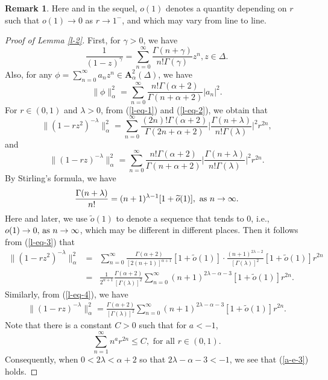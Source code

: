 \documentclass[10pt]{amsart}
\theoremstyle{definition}    %
\newtheorem{remark}[theorem]{Remark}
\numberwithin{equation}{section}
\begin{document}
\begin{remark}Here and in the sequel, ${o}(1)$ denotes a quantity depending on $r$ such that ${o}(1)\rightarrow 0$ as $r\rightarrow 1^{-}$, and which may vary from line to line.\end{remark}

\begin{proof}[Proof of Lemma \ref{l-2}]
First, for $\gamma>0$, we have 
\begin{equation}\label{l-eq-1}
  \frac{1}{(1-z)^{\gamma}}=\sum_{n=0}^{\infty}\frac{\Gamma(n+\gamma)}{n!\Gamma(\gamma)}z^n, z\in \Delta.\end{equation}
Also, for any $\phi=\sum_{n=0}^{\infty}a_nz^n\in \mathbf{A}_{\alpha}^2(\Delta)$, we have
\begin{equation}\label{l-eq-2}\|\phi\|_{\alpha}^2=\sum_{n=0}^{\infty}\frac{n!\Gamma(\alpha+2)}{\Gamma(n+\alpha+2)}|a_n|^{2}.
\end{equation}
For $r\in (0,1)$ and $\lambda>0$, from (\ref{l-eq-1}) and (\ref{l-eq-2}), we obtain that
  \begin{equation}\label{l-eq-3}
 \|{(1-rz^2)^{-\lambda}}\|_{\alpha}^2=\sum_{n=0}^{\infty}\frac{(2n)!\Gamma(\alpha+2)}{\Gamma(2n+\alpha+2)}\Big|\frac{\Gamma(n+\lambda)}{n!\Gamma(\lambda)}\Big|^2 r^{2n}, 
 \end{equation}
and 
 \begin{equation}\label{l-eq-4}
 \|{(1-rz)^{-\lambda}}\|_{\alpha}^2=\sum_{n=0}^{\infty}\frac{n!\Gamma(\alpha+2)}{\Gamma(n+\alpha+2)}\Big|\frac{\Gamma(n+\lambda)}{n!\Gamma(\lambda)}\Big|^2 r^{2n}.
 \end{equation}
By Stirling's formula, we have
 \begin{equation}
 \frac{\Gamma(n+\lambda)}{n!}=(n+1)^{\lambda-1}[1+\widetilde{o}(1)],\,\, {\textup{as}} \,\, n\rightarrow \infty.\nonumber 
 \end{equation}
 Here and later, we use $\widetilde{o}(1)$ to denote a sequence that tends to $0$, i.e., $o(1)\rightarrow 0, \, {\textup{as}}\,\, n \rightarrow \infty$, which may be different in different places. Then it follows from (\ref{l-eq-3}) that 
 \begin{eqnarray}\label{l-eq-5}
 \|{(1-rz^2)^{-\lambda}}\|_{\alpha}^2&=&\sum_{n=0}^{\infty}\frac{\Gamma(\alpha+2)}{[2(n+1)]^{\alpha+1}}[1+\widetilde{o}(1)]\cdot\frac{(n+1)^{2\lambda-2}}{[\Gamma(\lambda)]^2}[1+\widetilde{o}(1)]r^{2n}\nonumber \\
 &=&\frac{1}{2^{\alpha+1}}\frac{\Gamma(\alpha+2)}{[\Gamma(\lambda)]^2}\sum_{n=0}^{\infty}{(n+1)^{2\lambda-\alpha-3}}[1+\widetilde{o}(1)]r^{2n}.
 \end{eqnarray}
Similarly, from (\ref{l-eq-4}), we have 
 \begin{eqnarray}\label{l-eq-6}
 \|{(1-rz)^{-\lambda}}\|_{\alpha}^2=\frac{\Gamma(\alpha+2)}{[\Gamma(\lambda)]^2}\sum_{n=0}^{\infty}{(n+1)^{2\lambda-\alpha-3}}[1+\widetilde{o}(1)]r^{2n}.
 \end{eqnarray}
Note that there is a constant $C>0$ such that for $a<-1$,
$$\sum_{n=1}^{\infty}n^a r^{2n}\leq C,\,\,{\text{for all}}\,\, r\in (0,1).$$
Consequently, when $0<2\lambda<\alpha+2$ so that $2\lambda-\alpha-3<-1$, we see that (\ref{a-e-3}) holds. 


\end{proof}
\end{document}
